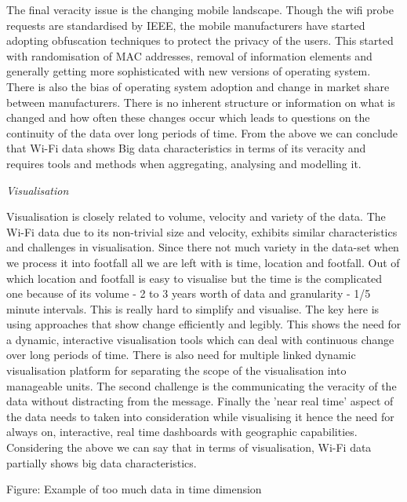The final veracity issue is the changing mobile landscape.
Though the wifi probe requests are standardised by IEEE, the mobile manufacturers have started adopting obfuscation techniques to protect the privacy of the users.
This started with randomisation of MAC addresses, removal of information elements and generally getting more sophisticated with new versions of operating system.
There is also the bias of operating system adoption and change in market share between manufacturers.
There is no inherent structure or information on what is changed and how often these changes occur which leads to questions on the continuity of the data over long periods of time.
From the above we can conclude that Wi-Fi data shows Big data characteristics in terms of its veracity and requires tools and methods when aggregating, analysing and modelling it.


\vspace{1.5em}\noindent\textit{Visualisation}\vspace{0.5em}

Visualisation is closely related to volume, velocity and variety of the data.
The Wi-Fi data due to its non-trivial size and velocity, exhibits similar characteristics and challenges in visualisation.
Since there not much variety in the data-set when we process it into footfall all we are left with is time, location and footfall.
Out of which location and footfall is easy to visualise but the time is the complicated one because of its volume - 2 to 3 years worth of data and granularity - 1/5 minute intervals.
This is really hard to simplify and visualise.
The key here is using approaches that show change efficiently and legibly.
This shows the need for a dynamic, interactive visualisation tools which can deal with continuous change over long periods of time.
There is also need for multiple linked dynamic visualisation platform for separating the scope of the visualisation into manageable units.
The second challenge is the communicating the veracity of the data without distracting from the message.
Finally the 'near real time' aspect of the data needs to taken into consideration while visualising it hence the need for always on, interactive, real time dashboards with geographic capabilities.
Considering the above we can say that in terms of visualisation, Wi-Fi data partially shows big data characteristics.

Figure: Example of too much data in time dimension

